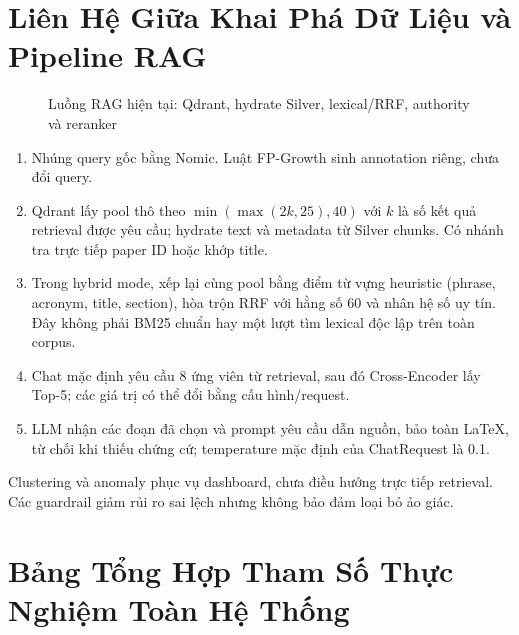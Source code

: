 \section{Liên Hệ Giữa Khai Phá Dữ Liệu và Pipeline RAG}
\begin{figure}[htbp]
\centering
\DrawRagPipelineDiagram
\caption{Luồng RAG hiện tại: Qdrant, hydrate Silver, lexical/RRF, authority và reranker}
\label{fig:rag_pipeline_flow}
\end{figure}
\begin{enumerate}
\item Nhúng query gốc bằng Nomic. Luật FP-Growth sinh annotation riêng, chưa đổi query.
\item Qdrant lấy pool thô theo $\min(\max(2k,25),40)$ với $k$ là số kết quả retrieval được yêu cầu; hydrate text và metadata từ Silver chunks. Có nhánh tra trực tiếp paper ID hoặc khớp title.
\item Trong hybrid mode, xếp lại cùng pool bằng điểm từ vựng heuristic (phrase, acronym, title, section), hòa trộn RRF với hằng số 60 và nhân hệ số uy tín. Đây không phải BM25 chuẩn hay một lượt tìm lexical độc lập trên toàn corpus.
\item Chat mặc định yêu cầu 8 ứng viên từ retrieval, sau đó Cross-Encoder lấy Top-5; các giá trị có thể đổi bằng cấu hình/request.
\item LLM nhận các đoạn đã chọn và prompt yêu cầu dẫn nguồn, bảo toàn LaTeX, từ chối khi thiếu chứng cứ; temperature mặc định của ChatRequest là 0.1.
\end{enumerate}
Clustering và anomaly phục vụ dashboard, chưa điều hướng trực tiếp retrieval. Các guardrail giảm rủi ro sai lệch nhưng không bảo đảm loại bỏ ảo giác.

\section{Bảng Tổng Hợp Tham Số Thực Nghiệm Toàn Hệ Thống}

